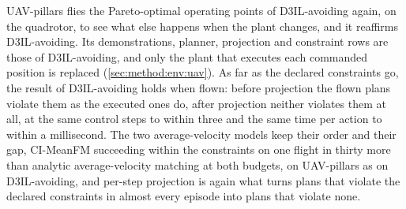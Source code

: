 UAV-pillars flies the Pareto-optimal operating points of D3IL-avoiding again, on the quadrotor, to see what
else happens when the plant changes, and it reaffirms D3IL-avoiding. Its demonstrations, planner, projection
and constraint rows are those of D3IL-avoiding, and only the plant that executes each commanded position is
replaced (\autoref{sec:method:env:uav}). As far as the declared constraints go, the result of D3IL-avoiding holds when
flown: before projection the flown plans violate them as the executed ones do, after projection neither
violates them at all, at the same control steps to within three and the same time per action to within a
millisecond. The two average-velocity models keep their order and their gap, CI-MeanFM succeeding within the
constraints on one flight in thirty more than analytic average-velocity matching at both budgets, on
UAV-pillars as on D3IL-avoiding, and per-step projection is again what turns plans that violate the declared
constraints in almost every episode into plans that violate none.


